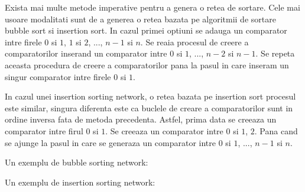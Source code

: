 \documentclass[12pt]{article}
\begin{document}
Exista mai multe metode imperative pentru a genera o retea de sortare. Cele mai usoare modalitati sunt de a generea o 
retea bazata pe algoritmii de sortare bubble sort si insertion sort. In cazul primei optiuni se adauga un comparator intre
firele $0$ si $1$, $1$ si $2$, ..., $n-1$ si $n$. Se reaia procesul de creere a comparatorilor inserand un comparator intre $0$ si $1$, ..., $n-2$ si $n-1$. Se repeta aceasta procedura de creere a comparatorilor pana la pasul in care inseram un singur comparator intre firele $0$ si $1$.

In cazul unei insertion sorting network, o retea bazata pe insertion sort procesul este similar, singura diferenta este ca buclele de creare a comparatorilor sunt in ordine inversa fata de metoda precedenta. Astfel, prima data se creeaza un comparator 
intre firul $0$ si $1$. Se creeaza un comparator intre $0$ si $1$, $2$. Pana cand se ajunge la pasul in care se generaza un comparator intre $0$ si $1$, ..., $n-1$ si $n$. 

Un exemplu de bubble sorting network:
\begin{center}
\end{center}

Un exemplu de insertion sorting network:

\begin{center}
\end{center}
\end{document}
